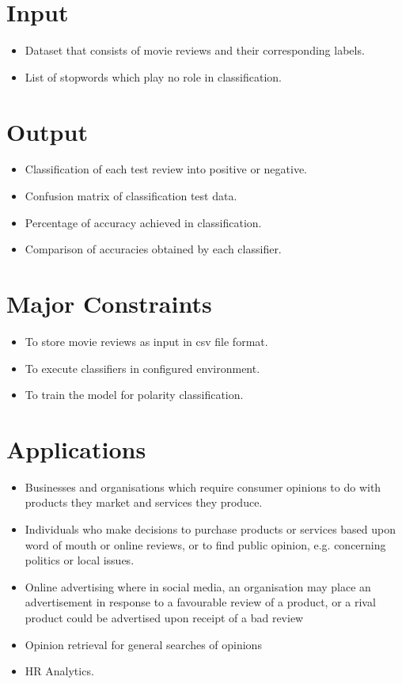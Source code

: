 \documentclass[oneside,a4paper,12pt]{pictreport}
\begin{document}
\section{Input}
\begin{itemize}
\item Dataset that consists of movie reviews and their corresponding labels.
\item List of stopwords which play no role in classification.
\end{itemize}


\section{Output}
\begin{itemize}
\item Classification of each test review into positive or negative.
\item Confusion matrix of classification test data.
\item Percentage of accuracy achieved in classification.
\item Comparison of accuracies obtained by each classifier.
\end{itemize}

\section{Major Constraints}

\begin{itemize}
\item To store movie reviews as input in csv file format.
\item To execute classifiers in configured environment.
\item To train the model for polarity classification.
\end{itemize}

\section{Applications}
\begin{itemize}
\item Businesses and organisations which require consumer opinions to do with products they market and services they produce.
\item Individuals who make decisions to purchase products or services based upon word of mouth 
or online reviews, or to find public opinion, e.g. concerning politics or local issues.
\item Online advertising where in social media, an organisation may place an advertisement in response to a 
favourable review of a product, or a rival product could be advertised upon receipt of a bad review
\item Opinion retrieval for general searches of opinions
\item HR Analytics.
\end{itemize}
\end{document}
